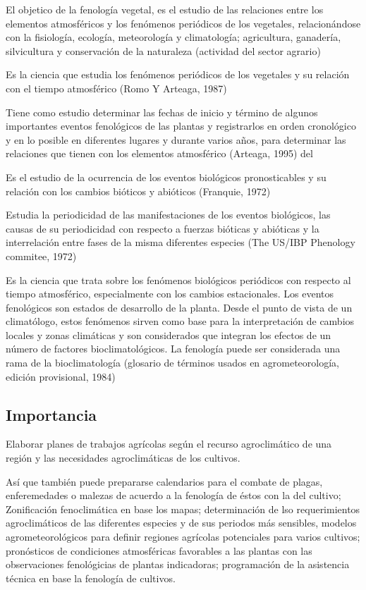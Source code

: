 El objetico de la fenología vegetal, es el estudio de las relaciones entre los elementos atmosféricos y los fenómenos periódicos de los vegetales, relacionándose con la fisiología, ecología, meteorología y climatología; agricultura, ganadería, silvicultura y conservación de la naturaleza (actividad del sector agrario)

\begin{definition}[Fenología]
    Es la ciencia que estudia los fenómenos periódicos de los vegetales y su relación con el tiempo atmosférico (Romo Y Arteaga, 1987)
\end{definition}

Tiene como estudio determinar las fechas de inicio y término de algunos importantes eventos fenológicos de las plantas y registrarlos en orden cronológico y en lo posible en diferentes lugares y durante varios años, para determinar las relaciones que tienen con los elementos atmosférico (Arteaga, 1995) del

Es el estudio de la ocurrencia de los eventos biológicos pronosticables y su relación con los cambios bióticos y abióticos (Franquie, 1972)

Estudia la periodicidad de las manifestaciones de los eventos biológicos, las causas de su periodicidad con respecto a fuerzas bióticas y abióticas y la interrelación entre fases de la misma diferentes especies (The US/IBP Phenology commitee, 1972)

Es la ciencia que trata sobre los fenómenos biológicos periódicos con respecto al tiempo atmosférico, especialmente con los cambios estacionales. Los eventos fenológicos son estados de desarrollo de la planta. Desde el punto de vista de un climatólogo, estos fenómenos sirven como base para la interpretación de cambios locales y zonas climáticas y son considerados que integran los efectos de un número de factores bioclimatológicos. La fenología puede ser considerada una rama de la bioclimatología (glosario de términos usados en agrometeorología, edición provisional, 1984)

\subsection{Importancia}

Elaborar planes de trabajos agrícolas según el recurso agroclimático de una región y las necesidades agroclimáticas de los cultivos.

Así que también puede prepararse calendarios para el combate de plagas, enferemedades o malezas de acuerdo a la fenología de éstos con la del cultivo; Zonificación fenoclimática en base los mapas; determinación de lso requerimientos agroclimáticos de las diferentes especies y de sus periodos más sensibles,
modelos agrometeorológicos para definir regiones agrícolas potenciales para varios cultivos; pronósticos de condiciones atmosféricas favorables a las plantas con las observaciones fenológicias de plantas indicadoras; programación de la asistencia técnica en base la fenología de cultivos.

